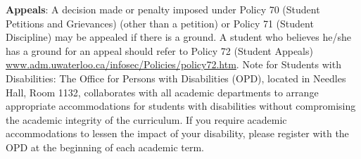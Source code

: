 \documentclass{article}
\begin{document}
\vspace*{1em}\noindent
{\bf Appeals}: A decision made or penalty imposed under Policy 70 (Student
Petitions and Grievances) (other than a petition) or Policy 71
(Student Discipline) may be appealed if there is a ground. A student
who believes he/she has a ground for an appeal should refer to Policy
72 (Student Appeals)
\url{www.adm.uwaterloo.ca/infosec/Policies/policy72.htm}.  Note for Students
with Disabilities: The Office for Persons with Disabilities (OPD),
located in Needles Hall, Room 1132, collaborates with all academic
departments to arrange appropriate accommodations for students with
disabilities without compromising the academic integrity of the
curriculum. If you require academic accommodations to lessen the
impact of your disability, please register with the OPD at the
beginning of each academic term.
\end{document}
